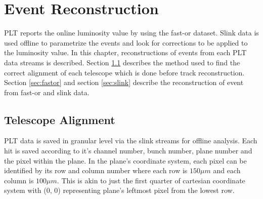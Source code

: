 
\chapter{Event Reconstruction} \label{ch:reconstruction}


PLT reports the online luminosity value by using the fast-or dataset. Slink data is used offline to parametrize the events and look for corrections to be applied to the luminosity value. In this chapter, reconstructions of events from each PLT data streams is described. Section \ref{sec:telAlign} describes the method used to find the correct alignment of each telescope which is done before track reconstruction. Section \ref{sec:fastor} and section \ref{sec:slink} describe the reconstruction of event from fast-or and slink data.



\section{Telescope Alignment} \label{sec:telAlign}



PLT data is saved in granular level via the slink streams for offline analysis. Each hit is saved according to it's channel number, bunch number, plane number and the pixel within the plane. In the plane's coordinate system, each pixel can be identified by its row and column number where each row is $150 \mu m$ and each column is $100 \mu m$. This is akin to just the first quarter of cartesian coordinate system with (0, 0) representing plane's leftmost pixel from the lowest row. 


